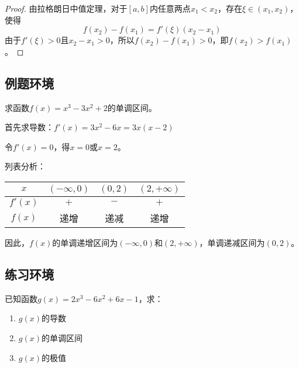 \documentclass{ColorMath}
\begin{document}
\begin{proof}
    由拉格朗日中值定理，对于$[a,b]$内任意两点$x_1 < x_2$，存在$\xi \in (x_1, x_2)$，使得
    $$f(x_2) - f(x_1) = f'(\xi)(x_2 - x_1)$$
    由于$f'(\xi) > 0$且$x_2 - x_1 > 0$，所以$f(x_2) - f(x_1) > 0$，即$f(x_2) > f(x_1)$。
\end{proof}

\subsection{例题环境}

\begin{example}
    求函数$f(x) = x^3 - 3x^2 + 2$的单调区间。
\end{example}

\begin{solution}
    首先求导数：$f'(x) = 3x^2 - 6x = 3x(x-2)$

    令$f'(x) = 0$，得$x = 0$或$x = 2$。

    列表分析：
    \begin{center}
        \begin{tabular}{|c|c|c|c|}
            \hline
            $x$     & $(-\infty, 0)$ & $(0, 2)$ & $(2, +\infty)$ \\
            \hline
            $f'(x)$ & $+$            & $-$      & $+$            \\
            \hline
            $f(x)$  & 递增             & 递减       & 递增             \\
            \hline
        \end{tabular}
    \end{center}

    因此，$f(x)$的单调递增区间为$(-\infty, 0)$和$(2, +\infty)$，单调递减区间为$(0, 2)$。
\end{solution}

\subsection{练习环境}

\begin{exercise}
    已知函数$g(x) = 2x^3 - 6x^2 + 6x - 1$，求：
    \begin{enumerate}
        \item $g(x)$的导数
        \item $g(x)$的单调区间
        \item $g(x)$的极值
    \end{enumerate}
\end{exercise}
\end{document}
